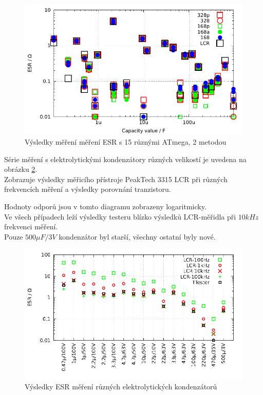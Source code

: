 \begin{figure}[H]
\centering
 \includegraphics[width=16cm]{../GNU/Cesr2.pdf}
\caption{Výsledky měření měření ESR s 15 různými ATmega, 2 metodou}
\label{fig:Cesr2}
\end{figure}

Série měření s elektrolytickými kondenzátory různých velikostí je uvedena na obrázku \ref{fig:ElcoESR}.\\
Zobrazuje výsledky měřicího přístroje PeakTech 3315 LCR při různých frekvencích měření a
výsledky porovnání tranzistoru.

Hodnoty odporů jsou v tomto diagramu zobrazeny logaritmicky.\\
Ve všech případech leží výsledky testeru blízko výsledků LCR-měřidla při \(10kHz\) frekvenci měření.\\ 
Pouze \(500\mu F/3V\) kondenzátor byl starší, všechny ostatní byly nové.

\begin{figure}[H]
\centering
\includegraphics[width=18cm]{../GNU/Elco_esr.pdf}
\caption{Výsledky ESR měření různých elektrolytických kondenzátorů}
\label{fig:ElcoESR}
\end{figure}

